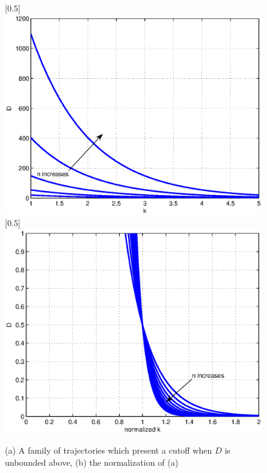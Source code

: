 \documentclass{article}
\begin{document}
\begin{figure}
 \centerline{
  \scalebox{0.5}[0.5]{\includegraphics{democutoff2.eps}}
  \scalebox{0.5}[0.5]{\includegraphics{democutoff2n.eps}}
} \caption{(a) A family of trajectories which present a cutoff when $D$ is unbounded above, (b) the normalization of (a)}
  \label{democutoff2}
\end{figure}
\end{document}
